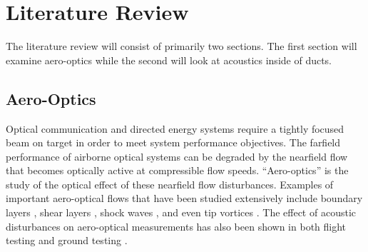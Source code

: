 
\chapter{Literature Review}
\label{chap:02_lit_review}
The literature review will consist of primarily two sections.
The first section will examine aero-optics while the second will look at acoustics inside of ducts.
\section{Aero-Optics}
Optical communication and directed energy systems require a tightly focused beam on target in order to meet system performance objectives.
The farfield performance of airborne optical systems can be degraded by the nearfield flow that becomes optically active at compressible flow speeds.
``Aero-optics'' is the study of the optical effect of these nearfield flow disturbances.
Examples of important aero-optical flows that have been studied extensively include boundary layers \cite{Gordeyev-2014-jcJndkHM,Smith-2013-VXArwwux,Wang-2012-gJ7rttg7}, shear layers \cite{Fitzgerald-2004-DgAgbreK,Rennie-2008-Wku6NheG}, shock waves \cite{Jumper-2013-8KtN3pue}, and even tip vortices \cite{Porter-2013-pQcNWHJ6}.
The effect of acoustic disturbances on aero-optical measurements has also been shown in both flight testing \cite{DeLucca-2018-gBQdjTmT} and ground testing \cite{Catron-2018-DdVp6VZf,Catron-2020-x8njYmmu}.

